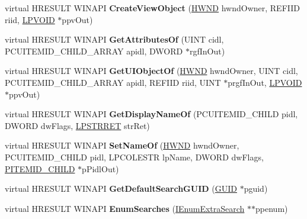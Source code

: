 \begin{DoxyCompactItemize}
virtual H\+R\+E\+S\+U\+LT W\+I\+N\+A\+PI {\bfseries Create\+View\+Object} (\hyperlink{interfacevoid}{H\+W\+ND} hwnd\+Owner, R\+E\+F\+I\+ID riid, \hyperlink{interfacevoid}{L\+P\+V\+O\+ID} $\ast$ppv\+Out)
\item 
\mbox{\label{class_c_desktop_folder_a705c1afee7aaeea324cdad6924718bae}} 
virtual H\+R\+E\+S\+U\+LT W\+I\+N\+A\+PI {\bfseries Get\+Attributes\+Of} (U\+I\+NT cidl, P\+C\+U\+I\+T\+E\+M\+I\+D\+\_\+\+C\+H\+I\+L\+D\+\_\+\+A\+R\+R\+AY apidl, D\+W\+O\+RD $\ast$rgf\+In\+Out)
\item 
\mbox{\label{class_c_desktop_folder_a4026ca9e9fd75119ca65ccc39fe11f86}} 
virtual H\+R\+E\+S\+U\+LT W\+I\+N\+A\+PI {\bfseries Get\+U\+I\+Object\+Of} (\hyperlink{interfacevoid}{H\+W\+ND} hwnd\+Owner, U\+I\+NT cidl, P\+C\+U\+I\+T\+E\+M\+I\+D\+\_\+\+C\+H\+I\+L\+D\+\_\+\+A\+R\+R\+AY apidl, R\+E\+F\+I\+ID riid, U\+I\+NT $\ast$prgf\+In\+Out, \hyperlink{interfacevoid}{L\+P\+V\+O\+ID} $\ast$ppv\+Out)
\item 
\mbox{\label{class_c_desktop_folder_a26f375cccfd3d5d9f92bc0e02e34fae3}} 
virtual H\+R\+E\+S\+U\+LT W\+I\+N\+A\+PI {\bfseries Get\+Display\+Name\+Of} (P\+C\+U\+I\+T\+E\+M\+I\+D\+\_\+\+C\+H\+I\+LD pidl, D\+W\+O\+RD dw\+Flags, \hyperlink{struct___s_t_r_r_e_t}{L\+P\+S\+T\+R\+R\+ET} str\+Ret)
\item 
\mbox{\label{class_c_desktop_folder_a3bd0347fd827ce70becd8bafd18bbeb6}} 
virtual H\+R\+E\+S\+U\+LT W\+I\+N\+A\+PI {\bfseries Set\+Name\+Of} (\hyperlink{interfacevoid}{H\+W\+ND} hwnd\+Owner, P\+C\+U\+I\+T\+E\+M\+I\+D\+\_\+\+C\+H\+I\+LD pidl, L\+P\+C\+O\+L\+E\+S\+TR lp\+Name, D\+W\+O\+RD dw\+Flags, \hyperlink{struct___i_t_e_m_i_d___c_h_i_l_d}{P\+I\+T\+E\+M\+I\+D\+\_\+\+C\+H\+I\+LD} $\ast$p\+Pidl\+Out)
\item 
\mbox{\label{class_c_desktop_folder_acdecf119f808d1af91c7c939c6ca87b8}} 
virtual H\+R\+E\+S\+U\+LT W\+I\+N\+A\+PI {\bfseries Get\+Default\+Search\+G\+U\+ID} (\hyperlink{interface_g_u_i_d}{G\+U\+ID} $\ast$pguid)
\item 
\mbox{\label{class_c_desktop_folder_afae952903203f5e41d9b9687785a2dbe}} 
virtual H\+R\+E\+S\+U\+LT W\+I\+N\+A\+PI {\bfseries Enum\+Searches} (\hyperlink{interface_i_enum_extra_search}{I\+Enum\+Extra\+Search} $\ast$$\ast$ppenum)
$$
\end{DoxyCompactItemize}
